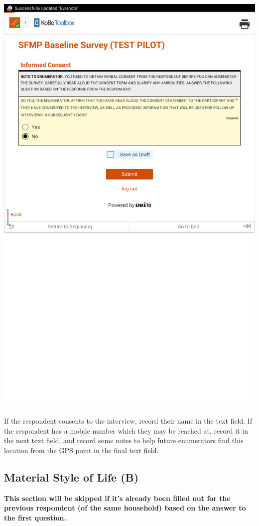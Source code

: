 \documentclass[a4paper]{refart}
\begin{document}
\includegraphics[width=\textwidth]{consent.png}

If the respondent consents to the interview, record their name in the text field. If the respondent has a mobile number which they may be reached at, record it in the next text field, and record some notes to help future enumerators find this location from the GPS point in the final text field.



\subsection{Material Style of Life (B)}
\textbf{This section will be skipped if it's already been filled out for the previous respondent (of the same household) based on the answer to the first question.}
\end{document}

